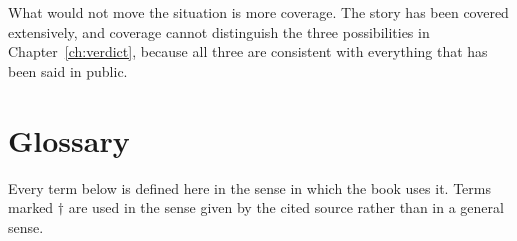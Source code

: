 What would not move the situation is more coverage. The story has been
covered extensively, and coverage cannot distinguish the three possibilities
in Chapter~\ref{ch:verdict}, because all three are consistent with everything
that has been said in public.

\vspace{10pt}

\chapter*{Glossary}
\thispagestyle{plain}

\noindent\small
Every term below is defined here in the sense in which the book uses it. Terms
marked \(\dagger\) are used in the sense given by the cited source rather than
in a general sense.

